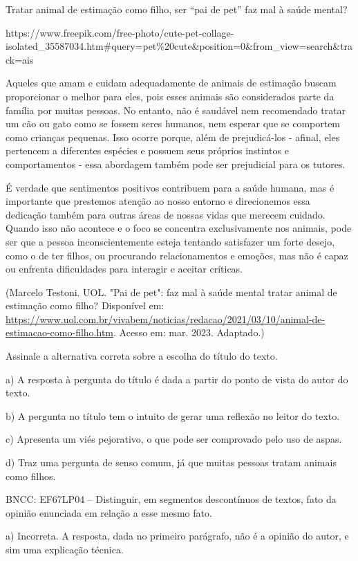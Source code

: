 Tratar animal de estimação como filho, ser ``pai de pet'' faz mal à
saúde mental?

https://www.freepik.com/free-photo/cute-pet-collage-isolated\_35587034.htm\#query=pet\%20cute\&position=0\&from\_view=search\&track=ais

Aqueles que amam e cuidam adequadamente de animais de estimação buscam
proporcionar o melhor para eles, pois esses animais são considerados
parte da família por muitas pessoas. No entanto, não é saudável nem
recomendado tratar um cão ou gato como se fossem seres humanos, nem
esperar que se comportem como crianças pequenas. Isso ocorre porque,
além de prejudicá-los - afinal, eles pertencem a diferentes espécies e
possuem seus próprios instintos e comportamentos - essa abordagem também
pode ser prejudicial para os tutores.

É verdade que sentimentos positivos contribuem para a saúde humana, mas
é importante que prestemos atenção ao nosso entorno e direcionemos essa
dedicação também para outras áreas de nossas vidas que merecem cuidado.
Quando isso não acontece e o foco se concentra exclusivamente nos
animais, pode ser que a pessoa inconscientemente esteja tentando
satisfazer um forte desejo, como o de ter filhos, ou procurando
relacionamentos e emoções, mas não é capaz ou enfrenta dificuldades para
interagir e aceitar críticas.

(Marcelo Testoni. UOL. "Pai de pet": faz mal à saúde mental tratar
animal de estimação como filho? Disponível em:
\url{https://www.uol.com.br/vivabem/noticias/redacao/2021/03/10/animal-de-estimacao-como-filho.htm}.
Acesso em: mar. 2023. Adaptado.)

Assinale a alternativa correta sobre a escolha do título do texto.

a) A resposta à pergunta do título é dada a partir do ponto de vista do
autor do texto.

b) A pergunta no título tem o intuito de gerar uma reflexão no leitor do
texto.

c) Apresenta um viés pejorativo, o que pode ser comprovado pelo uso de
aspas.

d) Traz uma pergunta de senso comum, já que muitas pessoas tratam
animais como filhos.

BNCC: EF67LP04 -- Distinguir, em segmentos descontínuos de textos, fato
da opinião enunciada em relação a esse mesmo fato.

a) Incorreta. A resposta, dada no primeiro parágrafo, não é a opinião do
autor, e sim uma explicação técnica.

